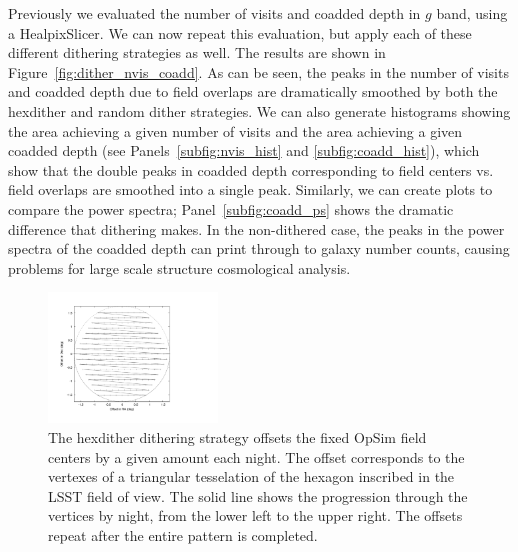 \documentclass[]{spie}  %
\begin{document}
Previously we evaluated the number of visits and coadded depth in $g$
band, using a HealpixSlicer. We can now repeat this evaluation, but
apply each of these different dithering strategies as well. The
results are shown in Figure~\ref{fig:dither_nvis_coadd}. As can be
seen, the peaks in the number of visits and coadded depth due to field
overlaps are dramatically smoothed by both the hexdither and random dither
strategies. We can also generate histograms showing the area achieving a
given number of visits and the area achieving a given coadded depth
(see Panels~\ref{subfig:nvis_hist} and \ref{subfig:coadd_hist}), which
show that the double peaks in coadded depth corresponding to field
centers vs. field overlaps are smoothed into a single peak. Similarly, we can
create plots to compare the power spectra; Panel~\ref{subfig:coadd_ps}
shows the dramatic difference that dithering makes. In the
non-dithered case, the peaks in the power spectra of the coadded depth
can print through to galaxy number counts, causing problems for large
scale structure cosmological analysis\cite{Carroll}.

\begin{figure}
\centering
\includegraphics[width=0.4\textwidth]{figures/dither_vert}
\caption[]
{\label{fig:vertices}
The hexdither dithering strategy offsets the fixed OpSim field centers
by a given amount each night. The offset corresponds to the vertexes
of a triangular tesselation of the hexagon inscribed in the LSST field
of view. The solid line shows the progression through the vertices by
night, from the lower left to the upper right. The offsets repeat
after the entire pattern is completed. }
\end{figure}
\end{document}
